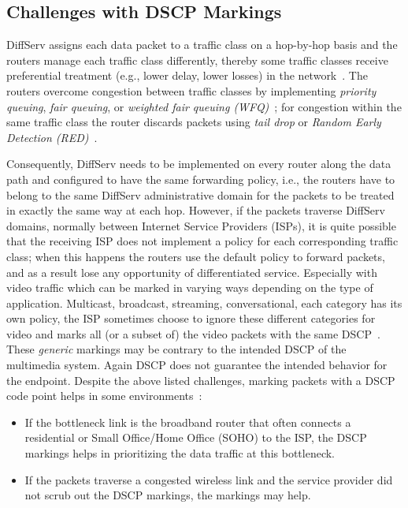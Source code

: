 \subsection{Challenges with DSCP Markings}

DiffServ assigns each data packet to a traffic class on a hop-by-hop basis and
the routers manage each traffic class differently, thereby some traffic
classes receive preferential treatment (e.g., lower delay, lower losses) in
the network~\cite{rfc2475}. The routers overcome congestion between traffic
classes by implementing \emph{priority queuing}, \emph{fair queuing}, or
\emph{weighted fair queuing (WFQ)}~\cite{rfc4594}; for congestion within the
same traffic class the router discards packets using \emph{tail drop} or
\emph{Random Early Detection (RED)}~\cite{Floyd:RED}.


Consequently, DiffServ needs to be implemented on every router along the data
path and configured to have the same forwarding policy, i.e., the routers have
to belong to the same DiffServ administrative domain for the packets to be
treated in exactly the same way at each hop. However, if the packets traverse
DiffServ domains, normally between Internet Service Providers (ISPs), it is
quite possible that the receiving ISP does not implement a policy for each
corresponding traffic class; when this happens the routers use the default
policy to forward packets, and as a result lose any opportunity of
differentiated service. Especially with video traffic which can be marked in
varying ways depending on the type of application. Multicast, broadcast,
streaming, conversational, each category has its own policy, the ISP sometimes
choose to ignore these different categories for video and marks all (or a
subset of) the video packets with the same DSCP~\cite{rfc5865}. These
\emph{generic} markings may be contrary to the intended DSCP of the multimedia
system. Again DSCP does not guarantee the intended behavior for the endpoint.
Despite the above listed challenges, marking packets with a DSCP code point
helps in some environments~\cite{draft.rtcweb.qos}:


\begin{itemize}

  \item If the bottleneck link is the broadband router that often connects a
  residential or Small Office/Home Office (SOHO) to the ISP, the DSCP markings
  helps in prioritizing the data traffic at this bottleneck.

  \item If the packets traverse a congested wireless link and the service
  provider did not scrub out the DSCP markings, the markings may help.

\end{itemize}

